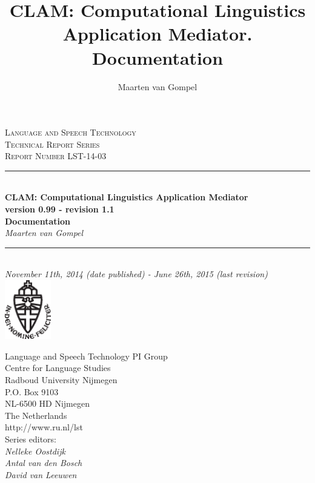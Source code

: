 \documentclass[a4paper,12pt,twoside,openright]{report}
\author{Maarten van Gompel}
\title{CLAM: Computational Linguistics Application Mediator. Documentation}
\newcommand{\HRule}{\rule{\linewidth}{0.5mm}} %
\begin{document}
\sffamily

\begin{titlepage}
\begin{center}
\textsc{\large Language and Speech Technology\\ Technical Report Series}\\[1.5cm] 
\textsc{Report Number LST-14-03}\\[0.5cm] 

\HRule \\[0.5cm]
{ \Large \bfseries CLAM: Computational Linguistics Application Mediator}\\[0.5cm] %
{\bf \small version 0.99 - revision 1.1} \\[0.5cm]
{ \Large \bfseries Documentation}\\[0.5cm]
{\large \emph{Maarten van Gompel}}\\[0.5cm]
\HRule \\[1.0cm]

\emph{November 11th, 2014 (date published) - June 26th, 2015 (last revision)} \\[0.5cm] 
\includegraphics[width=20.0mm]{ru-beeldmerk-zwart.eps}
\end{center}

\begin{minipage}{0.6\textwidth}
\begin{flushleft}
Language and Speech Technology PI Group \\
Centre for Language Studies \\
Radboud University Nijmegen \\
P.O. Box 9103 \\
NL-6500 HD Nijmegen \\
The Netherlands \\
http://www.ru.nl/lst \\[0.3cm]
Series editors: \\
\hspace{0.5cm}\emph{Nelleke Oostdijk}   \\
\hspace{0.5cm}\emph{Antal van den Bosch}  \\
\hspace{0.5cm}\emph{David van Leeuwen}  \\
\end{flushleft}
\end{minipage}

\end{titlepage}
\tableofcontents
\end{document}
